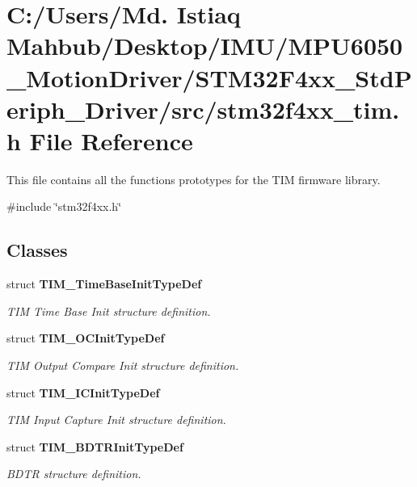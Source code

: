 \section{C\+:/\+Users/\+Md. Istiaq Mahbub/\+Desktop/\+I\+M\+U/\+M\+P\+U6050\+\_\+\+Motion\+Driver/\+S\+T\+M32\+F4xx\+\_\+\+Std\+Periph\+\_\+\+Driver/src/stm32f4xx\+\_\+tim.h File Reference}
\label{stm32f4xx__tim_8h}


This file contains all the functions prototypes for the T\+IM firmware library.  


{\ttfamily \#include \char`\"{}stm32f4xx.\+h\char`\"{}}\newline
\subsection*{Classes}
\begin{DoxyCompactItemize}
\item 
struct \textbf{ T\+I\+M\+\_\+\+Time\+Base\+Init\+Type\+Def}
\begin{DoxyCompactList}\small\item\em T\+IM Time Base Init structure definition. \end{DoxyCompactList}\item 
struct \textbf{ T\+I\+M\+\_\+\+O\+C\+Init\+Type\+Def}
\begin{DoxyCompactList}\small\item\em T\+IM Output Compare Init structure definition. \end{DoxyCompactList}\item 
struct \textbf{ T\+I\+M\+\_\+\+I\+C\+Init\+Type\+Def}
\begin{DoxyCompactList}\small\item\em T\+IM Input Capture Init structure definition. \end{DoxyCompactList}\item 
struct \textbf{ T\+I\+M\+\_\+\+B\+D\+T\+R\+Init\+Type\+Def}
\begin{DoxyCompactList}\small\item\em B\+D\+TR structure definition. \end{DoxyCompactList}\end{DoxyCompactItemize}
